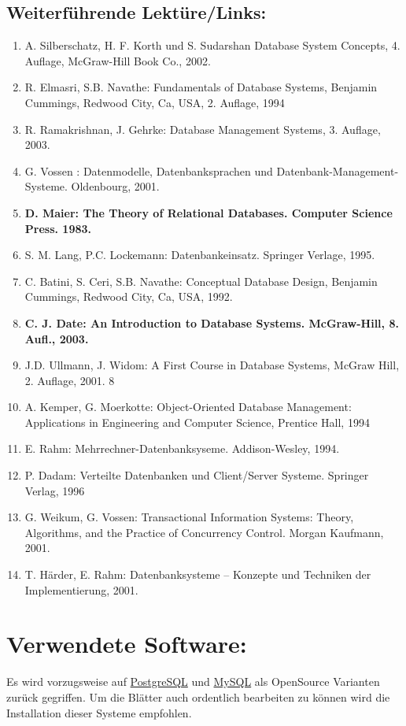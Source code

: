 \subsection{Weiterführende Lektüre/Links:}
\begin{enumerate}
\item A. Silberschatz, H. F. Korth und S. Sudarshan Database System Concepts, 4. Auflage, McGraw-Hill Book Co., 2002.
\item R. Elmasri, S.B. Navathe: Fundamentals of Database Systems, Benjamin Cummings, Redwood City, Ca, USA, 2. Auflage, 1994
\item R. Ramakrishnan, J. Gehrke: Database Management Systems, 3. Auflage, 2003.
\item G. Vossen : Datenmodelle, Datenbanksprachen und Datenbank-Management-Systeme. Oldenbourg, 2001.
\item \textbf{D. Maier: The Theory of Relational Databases. Computer Science Press. 1983.}
\item S. M. Lang, P.C. Lockemann: Datenbankeinsatz. Springer Verlage, 1995.
\item C. Batini, S. Ceri, S.B. Navathe: Conceptual Database Design, Benjamin Cummings, Redwood City, Ca, USA, 1992.
\item \textbf{C. J. Date: An Introduction to Database Systems. McGraw-Hill, 8. Aufl., 2003.}
\item J.D. Ullmann, J. Widom: A First Course in Database Systems, McGraw Hill, 2. Auflage, 2001. 8
\item A. Kemper, G. Moerkotte: Object-Oriented Database Management: Applications in Engineering and Computer
Science, Prentice Hall, 1994 
\item E. Rahm: Mehrrechner-Datenbanksyseme. Addison-Wesley, 1994.
\item P. Dadam: Verteilte Datenbanken und Client/Server Systeme. Springer Verlag, 1996
\item G. Weikum, G. Vossen: Transactional Information Systems: Theory, Algorithms, and the Practice of Concurrency Control. Morgan Kaufmann, 2001.
\item T. Härder, E. Rahm: Datenbanksysteme – Konzepte und Techniken der Implementierung, 2001.

\end{enumerate}
\section{Verwendete Software:}
Es wird vorzugsweise auf \href{http://www.postgresql.org/}{PostgreSQL} und \href{http://www.mysql.de/}{MySQL} als OpenSource Varianten zurück gegriffen. Um die Blätter auch ordentlich bearbeiten zu können wird die Installation dieser Systeme empfohlen. 